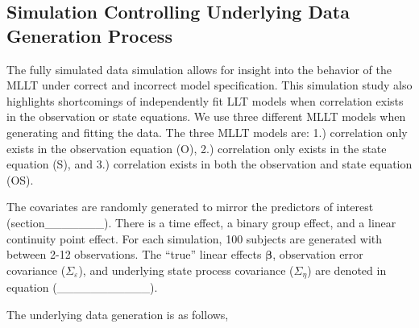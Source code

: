 \documentclass[
]{article}
\author{}
\date{\vspace{-2.5em}}
\begin{document}
\hypertarget{simulation-controlling-underlying-data-generation-process}{%
\subsection{Simulation Controlling Underlying Data Generation Process}\label{simulation-controlling-underlying-data-generation-process}}

The fully simulated data simulation allows for insight into the behavior of the MLLT under correct and incorrect model specification. This simulation study also highlights shortcomings of independently fit LLT models when correlation exists in the observation or state equations. We use three different MLLT models when generating and fitting the data. The three MLLT models are: 1.) correlation only exists in the observation equation (O), 2.) correlation only exists in the state equation (S), and 3.) correlation exists in both the observation and state equation (OS).

The covariates are randomly generated to mirror the predictors of interest (section\_\_\_\_\_\_\_). There is a time effect, a binary group effect, and a linear continuity point effect. For each simulation, 100 subjects are generated with between 2-12 observations. The ``true'' linear effects \(\boldsymbol{\beta}\), observation error covariance (\(\Sigma_\varepsilon\)), and underlying state process covariance (\(\Sigma_\eta\)) are denoted in equation (\_\_\_\_\_\_\_\_\_\_\_).

The underlying data generation is as follows,
\end{document}
